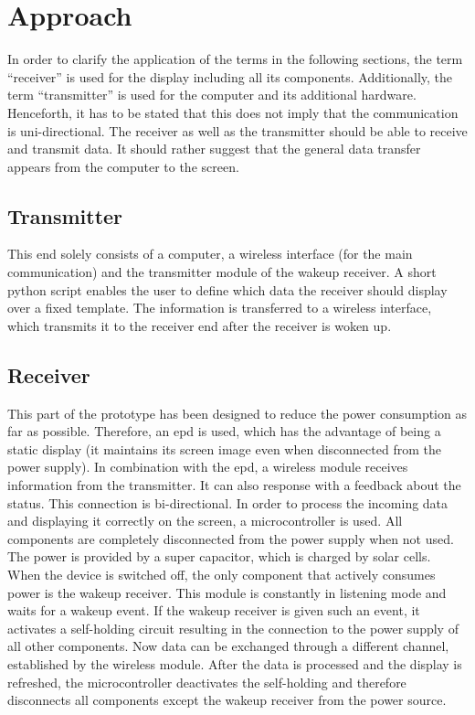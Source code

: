 \section{Approach}
In order to clarify the application of the terms in the following sections, the term “receiver” is used for the display including all its components. Additionally, the term “transmitter” is used for the computer and its additional hardware. Henceforth, it has to be stated that this does not imply that the communication is uni-directional. The receiver as well as the transmitter should be able to receive and transmit data. It should rather suggest that the general data transfer appears from the computer to the screen. 

\subsection{Transmitter}
This end solely consists of a computer, a wireless interface (for the main communication) and the transmitter module of the wakeup receiver. A short python script enables the user to define which data the receiver should display over a fixed template. The information is transferred to a wireless interface, which transmits it to the receiver end after the receiver is woken up.

\subsection{Receiver}
This part of the prototype has been designed to reduce the power consumption as far as possible. Therefore, an \acs{epd} is used, which has the advantage of being a static display (it maintains its screen image even when disconnected from the power supply). In combination with the \acs{epd}, a wireless module receives information from the transmitter. It can also response with a feedback about the status. This connection is bi-directional. In order to process the incoming data and displaying it correctly on the screen, a microcontroller is used. All components  are completely disconnected from the power supply when not used. The power is provided by a super capacitor, which is charged by solar cells. When the device is switched off, the only component that actively consumes power is the wakeup receiver. This module is constantly in listening mode and waits for a wakeup event. If the wakeup receiver is given such an event, it activates a self-holding circuit resulting in the connection to the power supply of all other components. Now data can be exchanged through a different channel, established by the wireless module. After the data is processed and the display is refreshed, the microcontroller deactivates the self-holding and therefore disconnects all components except the wakeup receiver from the power source.